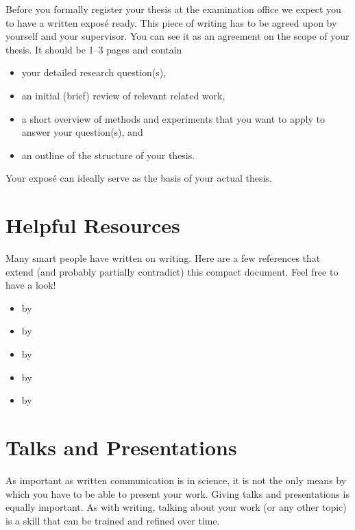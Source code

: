\documentclass[twocolumn]{mlai-guide}
\begin{document}
Before you formally register your thesis at the examination office we expect you to have a written expos\'{e} ready.
This piece of writing has to be agreed upon by yourself and your supervisor.
You can see it as an agreement on the scope of your thesis. 
It should be 1--3 pages and contain 
\begin{itemize}
\item your detailed research question(s),
\item an initial (brief) review of relevant related work,
\item a short overview of methods and experiments that you want to apply to answer your question(s), and
\item an outline of the structure of your thesis.
\end{itemize} 
Your expos\'{e} can ideally serve as the basis of your actual thesis.



\section{Helpful Resources} \label{sec:helpful-resources} 

Many smart people have written on writing. 
Here are a few references that extend (and probably partially contradict) this compact document.
Feel free to have a look!

\begin{itemize}
       \item {} by \textcite{keshav_how_to_read}
       \item {} by \textcite{zobel_writing}
       \item {} by \textcite{knuth_mathematical_writing}
       \item {} by \textcite{winston_how_to_speak}
       \item {} by \textcite{strunkwhite}
\end{itemize}{}


\section{Talks and Presentations}

As important as written communication is in science, it is not the only means by which you have to be able to present your work. Giving talks and presentations is equally important. As with writing, talking about your work (or any other topic) is a skill that can be trained and refined over time.
\end{document}
